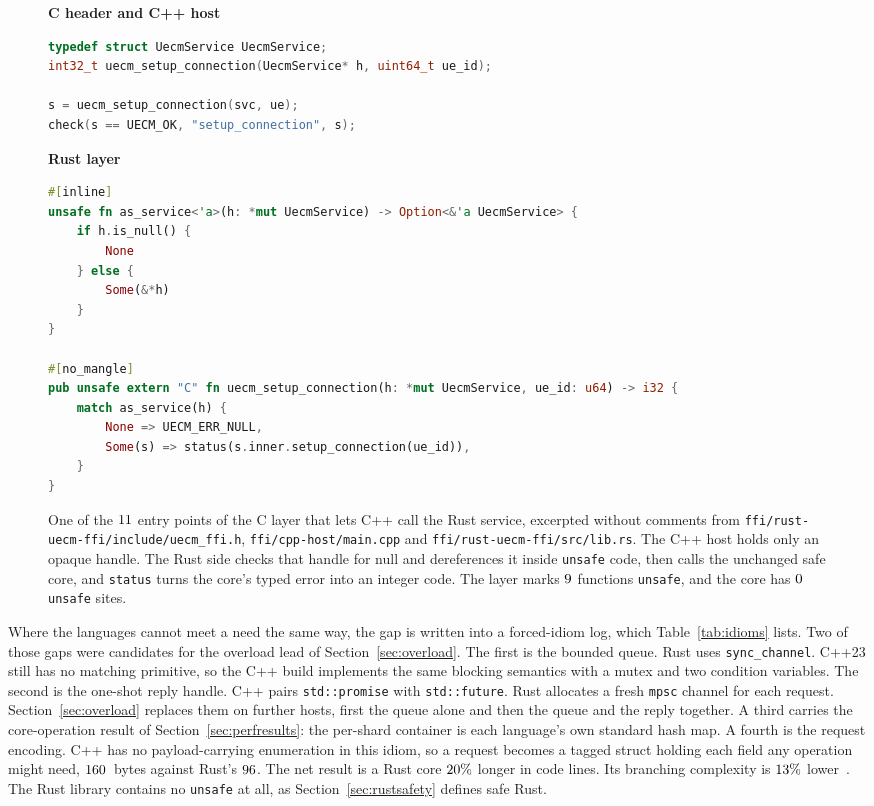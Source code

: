 \documentclass[english,oneside,a4paper,censored,csm,software-track-2020]{HYthesisML}
\begin{document}
\begin{figure}[!tbp]
\centering
\begin{minipage}{\linewidth}
{\footnotesize\textbf{C header and C++ host}}
\begin{lstlisting}[language=C++]
typedef struct UecmService UecmService;
int32_t uecm_setup_connection(UecmService* h, uint64_t ue_id);

s = uecm_setup_connection(svc, ue);
check(s == UECM_OK, "setup_connection", s);
\end{lstlisting}
{\footnotesize\textbf{Rust layer}}
\begin{lstlisting}[language=Rust]
#[inline]
unsafe fn as_service<'a>(h: *mut UecmService) -> Option<&'a UecmService> {
    if h.is_null() {
        None
    } else {
        Some(&*h)
    }
}

#[no_mangle]
pub unsafe extern "C" fn uecm_setup_connection(h: *mut UecmService, ue_id: u64) -> i32 {
    match as_service(h) {
        None => UECM_ERR_NULL,
        Some(s) => status(s.inner.setup_connection(ue_id)),
    }
}
\end{lstlisting}
\end{minipage}
\caption[One entry point of the C layer]{One of the $11$ entry
points of the C layer that lets C++ call the Rust service, excerpted without
comments from \texttt{ffi/rust-uecm-ffi/include/uecm\_ffi.h},
\texttt{ffi/cpp-host/main.cpp} and \texttt{ffi/rust-uecm-ffi/src/lib.rs}. The C++ host holds only an opaque handle.
The Rust side checks that handle for null and dereferences it inside
\texttt{unsafe} code, then calls the unchanged safe core, and \texttt{status}
turns the core's typed error into an integer code. The layer marks
$9$ functions \texttt{unsafe}, and the core has $0$
\texttt{unsafe} sites.\label{fig:ffilisting}}
\end{figure}

Where the languages cannot meet a need the same way, the gap is written into a
forced-idiom log, which Table~\ref{tab:idioms} lists. Two of those gaps were candidates for the
overload lead of Section~\ref{sec:overload}. The first is the bounded queue.
Rust uses \texttt{sync\_channel}. C++23 still has no matching primitive, so the
C++ build implements the same blocking semantics with a mutex and two condition
variables. The second is the one-shot reply handle. C++ pairs
\texttt{std::promise} with \texttt{std::future}. Rust allocates a fresh
\texttt{mpsc} channel for each request. Section~\ref{sec:overload} replaces
them on further hosts, first the queue alone and then the queue and the reply
together. A third carries the core-operation result of Section~\ref{sec:perfresults}: the
per-shard container is each language's own standard hash map. A fourth is the
request encoding. C++ has no payload-carrying enumeration in this idiom, so a
request becomes a tagged struct holding each field any operation might need,
$160$~bytes against Rust's $96$. The net result is
a Rust core $20\%$ longer in code lines. Its branching complexity is
$13\%$ lower~\cite{lizard}. The Rust library contains no
\texttt{unsafe} at all, as Section~\ref{sec:rustsafety} defines safe Rust.
\end{document}
